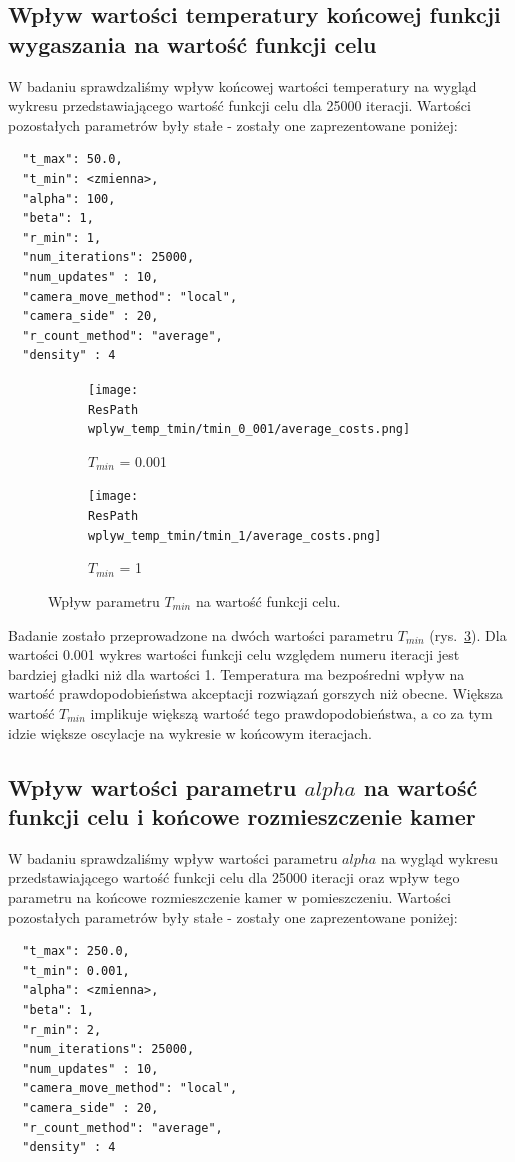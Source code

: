 \documentclass[12pt,a4paper]{article}
\newcommand{\ResPath}{../badania/}
\begin{document}
\subsection{Wpływ wartości temperatury końcowej funkcji wygaszania na wartość
funkcji celu}
W badaniu sprawdzaliśmy wpływ końcowej wartości temperatury na wygląd wykresu
przedstawiającego wartość funkcji celu dla 25000 iteracji. Wartości pozostałych
parametrów były stałe - zostały one zaprezentowane poniżej:

\begin{lstlisting}
  "t_max": 50.0,
  "t_min": <zmienna>,
  "alpha": 100,
  "beta": 1,
  "r_min": 1,
  "num_iterations": 25000,
  "num_updates" : 10,
  "camera_move_method": "local",
  "camera_side" : 20,
  "r_count_method": "average",
  "density" : 4
\end{lstlisting}
\begin{figure}[htb]
  \begin{subfigure}[b]{0.5\linewidth}
    \centering
    \texttt{[image: \\ResPath wplyw\_temp\_tmin/tmin\_0\_001/average\_costs.png]}
    \caption{$T_{min}$ = 0.001}
    \label{fig_tmin:a}
    \vspace{2ex}
  \end{subfigure}%
  \begin{subfigure}[b]{0.5\linewidth}
    \texttt{[image: \\ResPath wplyw\_temp\_tmin/tmin\_1/average\_costs.png]}
    \caption{$T_{min}$ = 1}
    \label{fig_tmin:b}
    \vspace{2ex}
  \end{subfigure}
  \caption{Wpływ parametru $T_{min}$ na wartość funkcji celu.}
  \label{fig_tmin}
\end{figure}
\newpage
Badanie zostało przeprowadzone na dwóch wartości parametru $T_{min}$
(rys.\ \ref{fig_tmin}).
Dla wartości 0.001 wykres wartości funkcji celu względem numeru iteracji
jest bardziej gładki niż dla wartości 1. Temperatura ma bezpośredni wpływ na wartość
prawdopodobieństwa akceptacji rozwiązań gorszych niż obecne. Większa wartość $T_{min}$
implikuje większą wartość tego prawdopodobieństwa, a co za tym idzie większe oscylacje na wykresie w końcowym iteracjach.

\subsection{Wpływ wartości parametru $alpha$ na wartość funkcji celu i końcowe
rozmieszczenie kamer}
W badaniu sprawdzaliśmy wpływ wartości parametru $alpha$ na wygląd wykresu przedstawiającego
wartość funkcji celu dla 25000 iteracji oraz wpływ tego parametru na końcowe
rozmieszczenie kamer w pomieszczeniu.
Wartości pozostałych parametrów były stałe - zostały one zaprezentowane poniżej:
\begin{lstlisting}
  "t_max": 250.0,
  "t_min": 0.001,
  "alpha": <zmienna>,
  "beta": 1,
  "r_min": 2,
  "num_iterations": 25000,
  "num_updates" : 10,
  "camera_move_method": "local",
  "camera_side" : 20,
  "r_count_method": "average",
  "density" : 4
\end{lstlisting}
\end{document}
